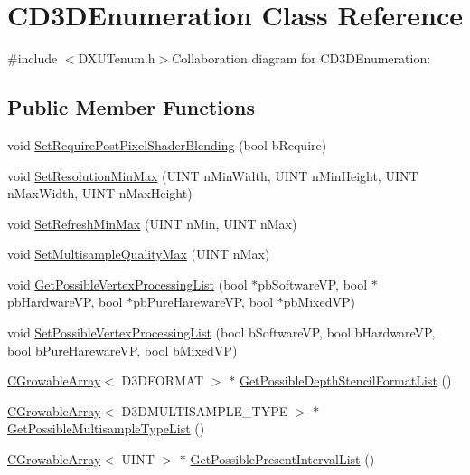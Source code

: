 \hypertarget{class_c_d3_d_enumeration}{
\section{CD3DEnumeration Class Reference}
\label{class_c_d3_d_enumeration}
}


{\ttfamily \#include $<$DXUTenum.h$>$}Collaboration diagram for CD3DEnumeration:\subsection*{Public Member Functions}
\begin{DoxyCompactItemize}
\item 
void \hyperlink{class_c_d3_d_enumeration_a7e4ccfa7f3ae0f393560d9c2b2e266d2}{SetRequirePostPixelShaderBlending} (bool bRequire)
\item 
void \hyperlink{class_c_d3_d_enumeration_abbf7dde5303569d4c3c0591962963b93}{SetResolutionMinMax} (UINT nMinWidth, UINT nMinHeight, UINT nMaxWidth, UINT nMaxHeight)
\item 
void \hyperlink{class_c_d3_d_enumeration_a13f65056cc94cb49eacbaf44a7f08ac8}{SetRefreshMinMax} (UINT nMin, UINT nMax)
\item 
void \hyperlink{class_c_d3_d_enumeration_ad7b8475ce673795395f252b279a3d622}{SetMultisampleQualityMax} (UINT nMax)
\item 
void \hyperlink{class_c_d3_d_enumeration_a4b417d97b0d4342f70486e540cb3e910}{GetPossibleVertexProcessingList} (bool $\ast$pbSoftwareVP, bool $\ast$pbHardwareVP, bool $\ast$pbPureHarewareVP, bool $\ast$pbMixedVP)
\item 
void \hyperlink{class_c_d3_d_enumeration_acc023b14d22d5a56f4c20c84bd1fbdb5}{SetPossibleVertexProcessingList} (bool bSoftwareVP, bool bHardwareVP, bool bPureHarewareVP, bool bMixedVP)
\item 
\hyperlink{class_c_growable_array}{CGrowableArray}$<$ D3DFORMAT $>$ $\ast$ \hyperlink{class_c_d3_d_enumeration_ae09bcb3c67d88efad3a9b01d2608911f}{GetPossibleDepthStencilFormatList} ()
\item 
\hyperlink{class_c_growable_array}{CGrowableArray}$<$ D3DMULTISAMPLE\_\-TYPE $>$ $\ast$ \hyperlink{class_c_d3_d_enumeration_afc90d28425aa281c45cb07f936e6d14e}{GetPossibleMultisampleTypeList} ()
\item 
\hyperlink{class_c_growable_array}{CGrowableArray}$<$ UINT $>$ $\ast$ \hyperlink{class_c_d3_d_enumeration_aac5d3d7ad9581157f3ac07413f2d6832}{GetPossiblePresentIntervalList} ()
\item 

\end{DoxyCompactItemize}
